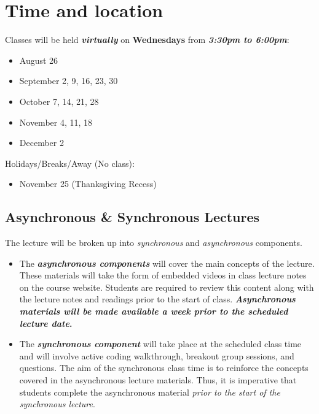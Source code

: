 \documentclass[
  12pt,
]{article}
\providecommand{\tightlist}{%
  \setlength{\itemsep}{0pt}\setlength{\parskip}{0pt}}
\begin{document}
\hypertarget{time-and-location}{%
\section{Time and location}\label{time-and-location}}

Classes will be held \textbf{\emph{virtually}} on \textbf{Wednesdays}
from \textbf{\emph{3:30pm to 6:00pm}}:

\begin{itemize}
\tightlist
\item
  August 26
\item
  September 2, 9, 16, 23, 30
\item
  October 7, 14, 21, 28
\item
  November 4, 11, 18
\item
  December 2
\end{itemize}

Holidays/Breaks/Away (No class):

\begin{itemize}
\tightlist
\item
  November 25 (Thanksgiving Recess)
\end{itemize}

\hypertarget{asynchronous-synchronous-lectures}{%
\subsection{Asynchronous \& Synchronous
Lectures}\label{asynchronous-synchronous-lectures}}

The lecture will be broken up into \emph{synchronous} and
\emph{asynchronous} components.

\begin{itemize}
\tightlist
\item
  The \textbf{\emph{asynchronous components}} will cover the main
  concepts of the lecture. These materials will take the form of
  embedded videos in class lecture notes on the course website. Students
  are required to review this content along with the lecture notes and
  readings prior to the start of class. \textbf{\emph{Asynchronous
  materials will be made available a \textbf{week prior} to the
  scheduled lecture date}.}
\item
  The \textbf{\emph{synchronous component}} will take place at the
  scheduled class time and will involve active coding walkthrough,
  breakout group sessions, and questions. The aim of the synchronous
  class time is to reinforce the concepts covered in the asynchronous
  lecture materials. Thus, it is imperative that students complete the
  asynchronous material \emph{prior to the start of the synchronous
  lecture}.
\end{itemize}
\end{document}
